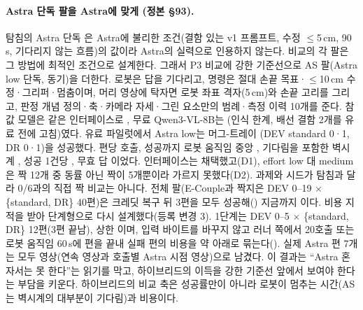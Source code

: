 \paragraph{Astra 단독 팔을 Astra에 맞게 (정본 §93).} 탐침의 Astra 단독 은 Astra에 불리한 조건(결함 있는 v1 프롬프트, 수정 $\le$5\,cm, 90\,s, 기다리지 않는 흐름)의 값이라 Astra의 실력으로 인용하지 않는다. 비교의 각 팔은 그 방법에 최적인 조건으로 설계한다. 그래서 P3 비교에 강한 기준선으로 AS 팔(Astra low 단독, 동기)을 더한다. 로봇은 답을 기다리고, 명령은 절대 손끝 목표·$\le$10\,cm 수정·그리퍼·멈춤이며, 머리 영상에 탁자면 로봇 좌표 격자(5\,cm)와 손끝 고리를 그리고, 판정 개념 정의·축·카메라 자세·그린 요소만의 범례·측정 이력 10개를 준다. 참값 모델은 같은 인터페이스로 , 무료 Qwen3-VL-8B는 (인식 한계, 배선 결함 2개를 유료 전에 고침)였다. 유료 파일럿에서 Astra low는 머그-트레이 (DEV standard 0·1, DR 0·1)을 성공했다. 편당 호출, 성공까지 로봇 움직임 중앙 , 기다림을 포함한 벽시계 , 성공 1건당 , 무효 답 이었다. 인터페이스는 채택했고(D1), effort low 대 medium은 짝 12개 중 동률 아닌 짝이 5개뿐이라 가르지 못했다(D2). 과제와 시드가 탐침과 달라 0/6과의 직접 짝 비교는 아니다. 전체 팔(E-Couple과 짝지은 DEV 0--19 $\times$ \{standard, DR\} 40편)은 크레딧 복구 뒤 3편을 모두 성공해() 지금까지 이다. 비용 지적을 받아 단계형으로 다시 설계했다(등록 변경 3). 1단계는 DEV 0--5 $\times$ \{standard, DR\} 12편(3편 끝남), 상한 이며, 입력 바이트를 바꾸지 않고 러너 쪽에서 20호출 또는 로봇 움직임 60\,s에 편을 끝내 실패 편의 비용을 약  아래로 묶는다(). 실제 Astra 편 7개는 모두 영상(연속 영상과 호출별 Astra 시점 영상)으로 남겼다. 이 결과는 ``Astra 혼자서는 못 한다''는 읽기를 막고, 하이브리드의 이득을 강한 기준선 앞에서 보여야 한다는 부담을 키운다. 하이브리드의 비교 축은 성공률만이 아니라 로봇이 멈추는 시간(AS는 벽시계의 대부분이 기다림)과 비용이다.

